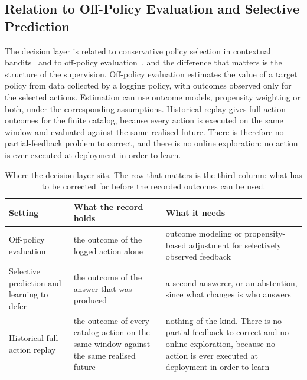 \documentclass{article}
\begin{document}
\subsection{Relation to Off-Policy Evaluation and Selective Prediction}
\label{app:ope-positioning}
The decision layer is related to conservative policy selection in contextual
bandits~\citep{abbasiyadkori2011improved,lattimore2020bandit} and to off-policy
evaluation~\citep{strehl2010learning,dudik2011doubly,swaminathan2015counterfactual,
jiang2016doubly,thomas2016data}, and the difference that matters is the structure of the
supervision. Off-policy evaluation estimates the value of a target policy from data collected
by a logging policy, with outcomes observed only for the selected actions. Estimation can
use outcome models, propensity weighting or both, under the corresponding assumptions. Historical replay gives full action outcomes for the finite catalog,
because every action is executed on the same window and evaluated against the same realised
future. There is therefore no partial-feedback problem to correct, and there is no online
exploration: no action is ever executed at deployment in order to learn.

\begin{table}[!t]
  \caption{Where the decision layer sits. The row that matters is the third column: what has to
  be corrected for before the recorded outcomes can be used.}
  \label{tab:app-positioning}
  \centering
  \small
  \setlength{\tabcolsep}{4pt}
\begin{tabular}{@{}p{} p{} p{}@{}}
    \toprule
    Setting & What the record holds & What it needs \\
    \midrule
    Off-policy evaluation & the outcome of the logged action alone & outcome modeling or propensity-based adjustment for selectively observed feedback \\
    Selective prediction and learning to defer & the outcome of the answer that was produced & a second answerer, or an abstention, since what changes is who answers \\
    Historical full-action replay & the outcome of every catalog action on the same window against the same realised future & nothing of the kind. There is no partial feedback to correct and no online exploration, because no action is ever executed at deployment in order to learn \\
    \bottomrule
  \end{tabular}
\end{table}
\end{document}
